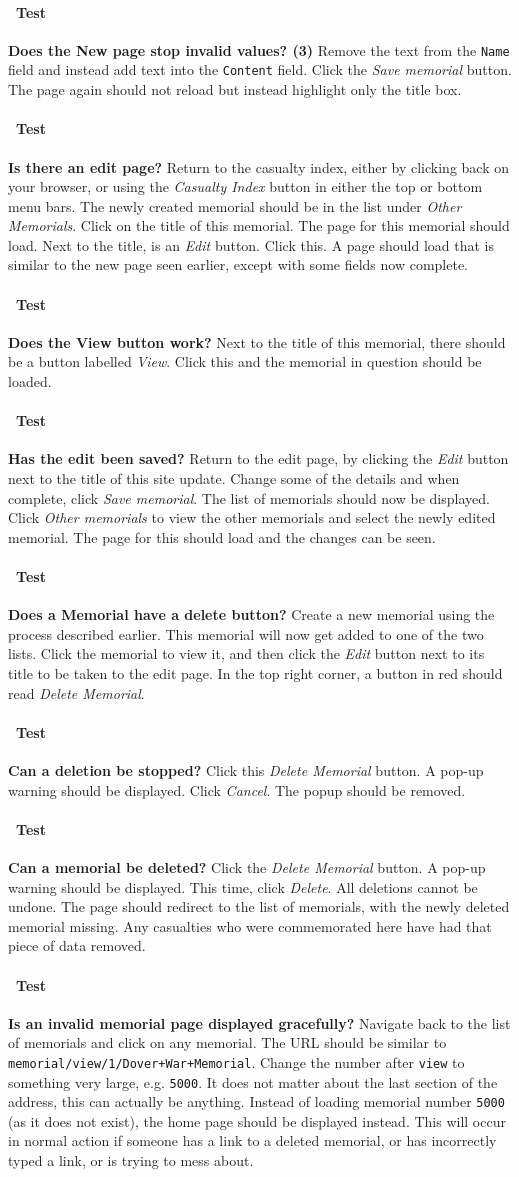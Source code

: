 \documentclass[12pt]{article}
\newcounter{Test}
\newcommand{\test}[1]{%
\stepcounter{Test}%
\paragraph{\Circle\ Test \theTest} \textbf{#1} }
\begin{document}
\test{Does the New page stop invalid values? (3)}
Remove the text from the \texttt{Name} field and instead add text into the \texttt{Content} field. Click the \textit{Save memorial} button. The page again should not reload but instead highlight only the title box.

\test{Is there an edit page?}
Return to the casualty index, either by clicking back on your browser, or using the \textit{Casualty Index} button in either the top or bottom menu bars. The newly created memorial should be in the list under \textit{Other Memorials}. Click on the title of this memorial. The page for this memorial should load. Next to the title, is an \textit{Edit} button. Click this. A page should load that is similar to the new page seen earlier, except with some fields now complete.

\test{Does the View button work?}
Next to the title of this memorial, there should be a button labelled \textit{View}. Click this and the memorial in question should be loaded.

\test{Has the edit been saved?}
Return to the edit page, by clicking the \textit{Edit} button next to the title of this site update. Change some of the details and when complete, click \textit{Save memorial}. The list of memorials should now be displayed. Click \textit{Other memorials} to view the other memorials and select the newly edited memorial. The page for this should load and the changes can be seen.

\test{Does a Memorial have a delete button?}
Create a new memorial using the process described earlier. This memorial will now get added to one of the two lists. Click the memorial to view it, and then click the \textit{Edit} button next to its title to be taken to the edit page. In the top right corner, a button in red should read \textit{Delete Memorial}.

\test{Can a deletion be stopped?}
Click this \textit{Delete Memorial} button. A pop-up warning should be displayed. Click \textit{Cancel}. The popup should be removed.

\test{Can a memorial be deleted?}
Click the \textit{Delete Memorial} button. A pop-up warning should be displayed. This time, click \textit{Delete}. All deletions cannot be undone. The page should redirect to the list of memorials, with the newly deleted memorial missing. Any casualties who were commemorated here have had that piece of data removed.

\test{Is an invalid memorial page displayed gracefully?}
Navigate back to the list of memorials and click on any memorial. The URL should be similar to \texttt{memorial/view/1/Dover+War+Memorial}. Change the number after \texttt{view} to something very large, e.g. \texttt{5000}. It does not matter about the last section of the address, this can actually be anything. Instead of loading memorial number \texttt{5000} (as it does not exist), the home page should be displayed instead. This will occur in normal action if someone has a link to a deleted memorial, or has incorrectly typed a link, or is trying to mess about.
\end{document}
